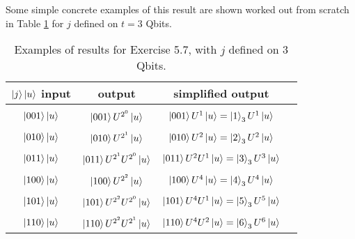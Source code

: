 \documentclass{article}
\begin{document}
\begin{enumerate}[label=\textbf{(\arabic*)}]
Some simple concrete examples of this result are shown worked out from scratch in Table \ref{table:Prob_5.7} for $j$ defined on $t=3$ Qbits.

\begin{table}[th]
    \captionsetup{font=small, width = 14cm}
    \centering
    \begin{tabular}{c|c|c|c}
        $\ket{j}\ket{u}$ input & output & simplified output\\
        \hline\hline
        &&\\[-5pt]
        $\ket{001}\ket{u}$
        & $\ket{001}U^{2^0}\ket{u}$
        & $\ket{001}U^{1}\ket{u} = \ket{1}_3 U^{1}\ket{u}$
        \\[5pt]
        \hline
        &&\\[-5pt]
        $\ket{010}\ket{u}$
        & $\ket{010}U^{2^1}\ket{u}$
        & $\ket{010}U^{2}\ket{u} = \ket{2}_3 U^{2}\ket{u}$
        \\[5pt]
        \hline
        &&\\[-5pt]
        $\ket{011}\ket{u}$
        & $\ket{011}U^{2^1}U^{2^0}\ket{u}$
        & $\ket{011}U^{2}U^{1}\ket{u} = \ket{3}_3 U^{3}\ket{u}$
        \\[5pt]
        \hline
        &&\\[-5pt]
        $\ket{100}\ket{u}$
        & $\ket{100}U^{2^2}\ket{u}$
        & $\ket{100}U^{4}\ket{u} = \ket{4}_3 U^{4}\ket{u}$
        \\[5pt]
        \hline
        &&\\[-5pt]
        $\ket{101}\ket{u}$
        & $\ket{101}U^{2^2}U^{2^0}\ket{u}$
        & $\ket{101}U^{4}U^{1}\ket{u} = \ket{5}_3 U^{5}\ket{u}$
        \\[5pt]
        \hline
        &&\\[-5pt]
        $\ket{110}\ket{u}$
        & $\ket{110}U^{2^2}U^{2^1}\ket{u}$
        & $\ket{110}U^{4}U^{2}\ket{u} = \ket{6}_3 U^{6}\ket{u}$
        \\[5pt]
        \hline
        \end{tabular}
    \caption{Examples of results for Exercise 5.7, with $j$ defined on 3 Qbits.}
    \label{table:Prob_5.7}
\end{table}

\clearpage

\end{enumerate}

\printbibliography
\end{document}
